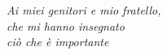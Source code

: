 \newpage
\thispagestyle{empty}
\begin{flushright}
\null{}
\textit{Ai miei genitori e mio fratello, \\
che mi hanno insegnato \\
ci\`o che \`e importante \\
}
\null
\end{flushright}
\newpage